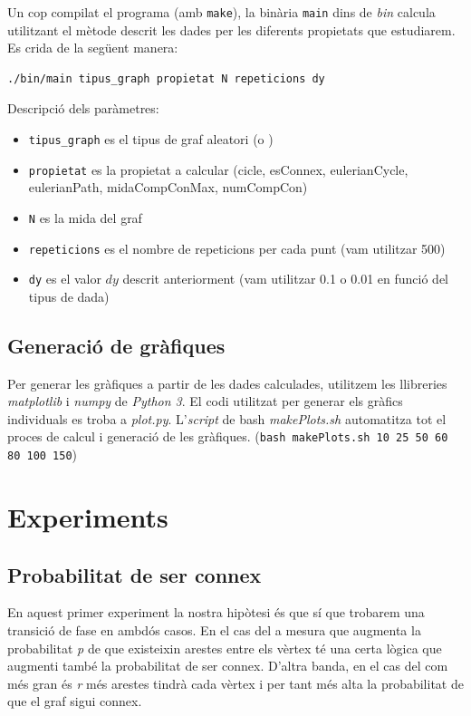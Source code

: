 Un cop compilat el programa (amb \texttt{make}), la binària \texttt{main} dins de \emph{bin} calcula utilitzant 
el mètode descrit les dades per les diferents propietats que estudiarem. Es crida de la següent manera:

\begin{verbatim}
./bin/main tipus_graph propietat N repeticions dy
\end{verbatim}

Descripció dels paràmetres:

\begin{itemize}
    \item  \texttt{tipus\_graph} es el tipus de graf aleatori (\BRG o \RGG)
    \item  \texttt{propietat} es la propietat a calcular (cicle, esConnex, eulerianCycle, eulerianPath, midaCompConMax, numCompCon)
    \item  \texttt{N} es la mida del graf
    \item  \texttt{repeticions} es el nombre de repeticions per cada punt (vam utilitzar 500)
    \item  \texttt{dy} es el valor $dy$ descrit anteriorment (vam utilitzar 0.1 o 0.01 en funció del tipus de dada)
\end{itemize}

\subsection{Generació de gràfiques}

Per generar les gràfiques a partir de les dades calculades, utilitzem les llibreries \emph{matplotlib} i 
\emph{numpy} de \emph{Python 3}. El codi utilitzat per generar els gràfics individuals es troba a \emph{plot.py}.
L'\emph{script} de bash \emph{makePlots.sh} automatitza tot el proces de calcul i generació de les gràfiques.
(\texttt{bash makePlots.sh 10 25 50 60 80 100 150})

\section{Experiments}
\subsection{Probabilitat de ser connex}
En aquest primer experiment la nostra hipòtesi és que sí que trobarem una transició de fase en ambdós casos. En el cas del \BRG a mesura que augmenta la probabilitat \emph{p} de que existeixin arestes entre els vèrtex té una certa lògica que augmenti també la probabilitat de ser connex. D'altra banda, en el cas del \RGG com més gran és \emph{r} més arestes tindrà cada vèrtex i per tant més alta la probabilitat de que el graf sigui connex.

